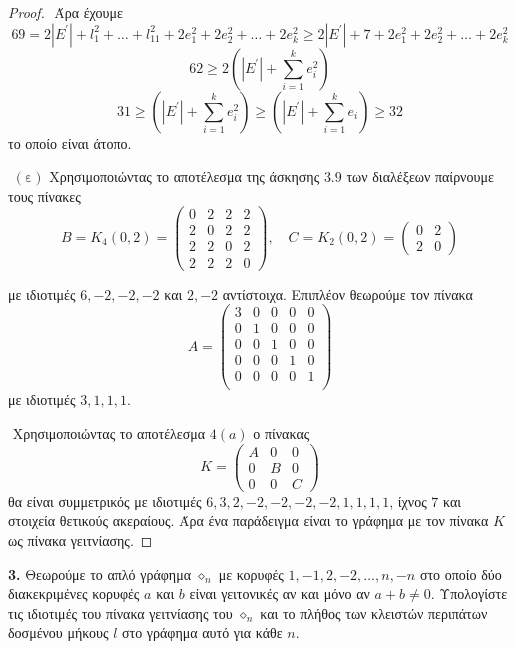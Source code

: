\documentclass[oneside,a4paper]{article}
\begin{document}
\begin{proof}
	$ $\newline
	Άρα έχουμε
	$$69 = 2|E^{\prime}| + l^2_1 + \ldots + l^2_{11} + 2e^2_1 + 2e^2_2 + \ldots + 2e^2_k \geq 2|E^{\prime}| + 7 + 2e^2_1 + 2e^2_2 + \ldots + 2e^2_k$$
	$$62 \geq 2\left(|E^{\prime}| + \sum\limits_{i=1}^k e^2_i\right)$$
	$$31 \geq \left(|E^{\prime}| + \sum\limits_{i=1}^k e^2_i\right) \geq \left(|E^{\prime}| + \sum\limits_{i=1}^k e_i\right) \geq 32$$
	το οποίο είναι άτοπο.

	$ $\newline
	$(\text{ε})$ Χρησιμοποιώντας το αποτέλεσμα της άσκησης $3.9$ των διαλέξεων παίρνουμε τους πίνακες
	$$B = K_4 (0,2) = \begin{pmatrix}
		0 & 2 & 2 & 2 \\
		2 & 0 & 2 & 2 \\
		2 & 2 & 0 & 2 \\
		2 & 2 & 2 & 0
	\end{pmatrix}, \quad C = K_2(0,2) = \begin{pmatrix}
		0 & 2\\
		2 & 0
	\end{pmatrix}$$

	με ιδιοτιμές $6,-2,-2,-2$ και $2,-2$ αντίστοιχα. Επιπλέον θεωρούμε τον πίνακα
	$$A = \begin{pmatrix}
		3 & 0 & 0 & 0 & 0 \\
		0 & 1 & 0 & 0 & 0 \\
		0 & 0 & 1 & 0 & 0 \\
		0 & 0 & 0 & 1 & 0 \\
		0 & 0 & 0 & 0 & 1 \\
	\end{pmatrix}$$
	με ιδιοτιμές $3,1,1,1$.

	$ $\newline
	Χρησιμοποιώντας το αποτέλεσμα $4 (a)$ ο πίνακας
	$$K = \begin{pmatrix}
		A & 0 &0 \\
		0& B & 0\\
		0& 0 & C
	\end{pmatrix}$$
	θα είναι συμμετρικός με ιδιοτιμές $6,3,2,-2,-2,-2,-2,1,1,1,1$, ίχνος $7$ και στοιχεία θετικούς ακεραίους. Άρα ένα παράδειγμα είναι το γράφημα με τον πίνακα $K$ ως πίνακα γειτνίασης.
\end{proof}





\pagebreak

\textbf{3.} Θεωρούμε το απλό γράφημα $\diamond_n$ με κορυφές $1,-1,2,-2,\ldots,n,-n$ στο οποίο δύο διακεκριμένες κορυφές $a$ και $b$ είναι γειτονικές αν και μόνο αν $a+b \neq 0$. Υπολογίστε τις ιδιοτιμές του πίνακα γειτνίασης του $\diamond_n$ και το πλήθος των κλειστών περιπάτων δοσμένου μήκους $l$ στο γράφημα αυτό για κάθε $n$.
\end{document}
